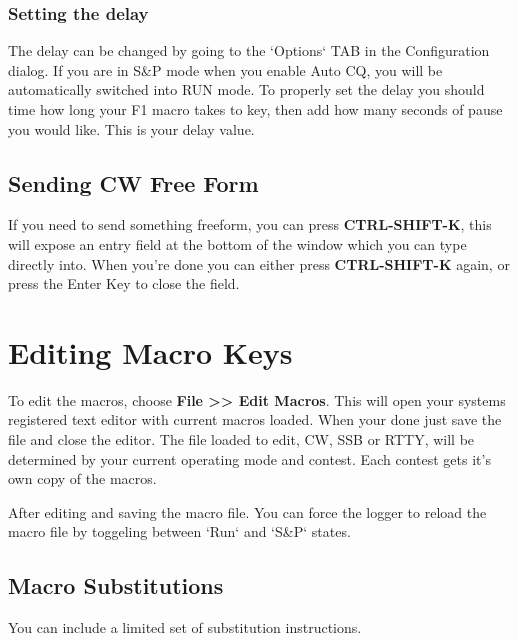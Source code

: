 \documentclass{article}
\begin{document}
\subsubsection{Setting the delay}
The delay can be changed by going to the `Options` TAB in the Configuration dialog. If you are in S\&P mode when you enable Auto CQ, you will be automatically switched into RUN mode. To properly set the delay you should time how long your F1 macro takes to key, then add how many seconds of pause you would like. This is your delay value.
\subsection{Sending CW Free Form}
If you need to send something freeform, you can press \textbf{CTRL-SHIFT-K}, this will expose an entry field at the bottom of the window which you can type directly into. When you're done you can either press \textbf{CTRL-SHIFT-K} again, or press the Enter Key to close the field.
\newpage
\section{Editing Macro Keys}
To edit the macros, choose \textbf{File >> Edit Macros}. This will open your systems registered text editor with current macros loaded. When your done just save the file and close the editor. The file loaded to edit, CW, SSB or RTTY, will be determined by your current operating mode and contest. Each contest gets it's own copy of the macros.

After editing and saving the macro file. You can force the logger to reload the macro file by toggeling between `Run` and `S\&P` states.

\subsection{Macro Substitutions}

You can include a limited set of substitution instructions.
\end{document}
